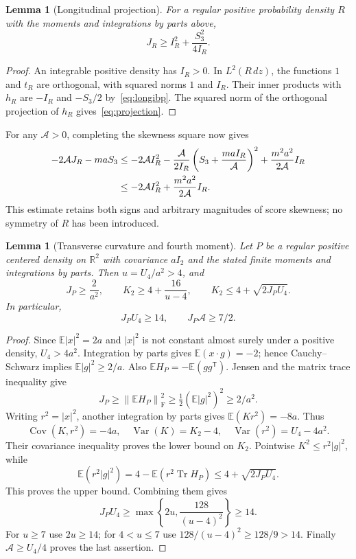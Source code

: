 \documentclass[11pt]{article}
\numberwithin{equation}{section}
\newtheorem{lemma}[theorem]{Lemma}
\newcommand{\R}{\mathbb R}
\newcommand{\E}{\mathbb E}
\newcommand{\tr}{\operatorname{Tr}}
\newcommand{\normF}[1]{\left\|#1\right\|_{\mathrm F}}
\begin{document}
\begin{lemma}[Longitudinal projection]\label{lem:long}
For a regular positive probability density \(R\) with the moments and
integrations by parts above,
\begin{equation}\label{eq:projection}
 J_R\geq I_R^2+\frac{S_3^2}{4I_R}.
\end{equation}
\end{lemma}
\begin{proof}
An integrable positive density has \(I_R>0\). In \(L^2(R\,dz)\), the
functions \(1\) and \(t_R\) are orthogonal, with squared norms \(1\)
and \(I_R\). Their inner products with \(h_R\) are \(-I_R\) and
\(-S_3/2\) by~\eqref{eq:longibp}. The squared norm of the orthogonal
projection of \(h_R\) gives~\eqref{eq:projection}.
\end{proof}

For any \(\mathcal A>0\), completing the skewness square now gives
\begin{align}
 -2\mathcal A J_R-maS_3
 &\leq-2\mathcal A I_R^2
   -\frac{\mathcal A}{2I_R}
       \left(S_3+\frac{maI_R}{\mathcal A}\right)^2
   +\frac{m^2a^2}{2\mathcal A}I_R\notag\\
 &\leq-2\mathcal A I_R^2+\frac{m^2a^2}{2\mathcal A}I_R.
 \label{eq:square}
\end{align}
This estimate retains both signs and arbitrary magnitudes of score
skewness; no symmetry of \(R\) has been introduced.

\begin{lemma}[Transverse curvature and fourth moment]\label{lem:trans}
Let \(P\) be a regular positive centered density on \(\R^2\) with
covariance \(aI_2\) and the stated finite moments and integrations by
parts. Then \(u=U_4/a^2>4\), and
\begin{equation}\label{eq:threebounds}
 J_P\geq\frac2{a^2},\qquad
 K_2\geq4+\frac{16}{u-4},\qquad
 K_2\leq4+\sqrt{2J_PU_4}.
\end{equation}
In particular,
\begin{equation}\label{eq:14}
 J_PU_4\geq14,\qquad J_P\mathcal A\geq7/2.
\end{equation}
\end{lemma}
\begin{proof}
Since \(\E|x|^2=2a\) and \(|x|^2\) is not constant almost surely
under a positive density, \(U_4>4a^2\). Integration by parts gives
\(\E(x\cdot g)=-2\); hence Cauchy--Schwarz implies
\(\E|g|^2\geq2/a\). Also
\(\E H_P=-\E(gg^{\mathsf T})\). Jensen and the matrix trace inequality
give
\[
 J_P\geq\normF{\E H_P}^2
       \geq\tfrac12(\E|g|^2)^2\geq2/a^2.
\]
Writing \(r^2=|x|^2\), another integration by parts gives
\(\E(Kr^2)=-8a\). Thus
\[
 \operatorname{Cov}(K,r^2)=-4a,\quad
 \operatorname{Var}(K)=K_2-4,\quad
 \operatorname{Var}(r^2)=U_4-4a^2.
\]
Their covariance inequality proves the lower bound on \(K_2\).
Pointwise \(K^2\leq r^2|g|^2\), while
\[
 \E(r^2|g|^2)=4-\E(r^2\tr H_P)
       \leq4+\sqrt{2J_PU_4}.
\]
This proves the upper bound. Combining them gives
\[
 J_PU_4\geq\max\left\{2u,\frac{128}{(u-4)^2}\right\}\geq14.
\]
For \(u\geq7\) use \(2u\geq14\); for \(4<u\leq7\) use
\(128/(u-4)^2\geq128/9>14\). Finally
\(\mathcal A\geq U_4/4\) proves the last assertion.
\end{proof}
\end{document}
